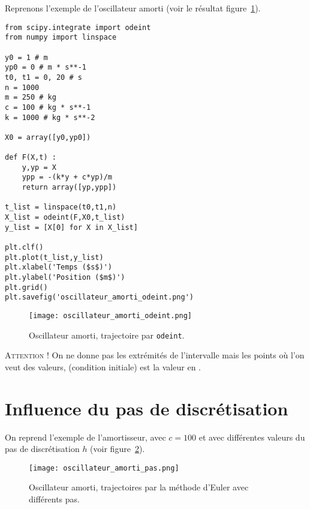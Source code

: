Reprenons l'exemple de l'oscillateur amorti (voir le résultat figure~\ref{11:fig:oscillateur_amorti_odeint}).
\begin{lstlisting}
from scipy.integrate import odeint
from numpy import linspace

y0 = 1 # m
yp0 = 0 # m * s**-1
t0, t1 = 0, 20 # s
n = 1000
m = 250 # kg
c = 100 # kg * s**-1
k = 1000 # kg * s**-2

X0 = array([y0,yp0])

def F(X,t) :
    y,yp = X
    ypp = -(k*y + c*yp)/m
    return array([yp,ypp])

t_list = linspace(t0,t1,n)
X_list = odeint(F,X0,t_list)
y_list = [X[0] for X in X_list]

plt.clf()
plt.plot(t_list,y_list)
plt.xlabel('Temps ($s$)')
plt.ylabel('Position ($m$)')
plt.grid()
plt.savefig('oscillateur_amorti_odeint.png')
\end{lstlisting}



\begin{figure}[!h]
    \begin{center}
        \texttt{[image: oscillateur\_amorti\_odeint.png]}
        \caption{Oscillateur amorti, trajectoire par \texttt{odeint}.}
        \label{11:fig:oscillateur_amorti_odeint}
    \end{center}
\end{figure}
\textsc{Attention !} On ne donne pas les extrémités de l'intervalle mais les points  où l'on veut des valeurs,  (condition initiale) est la valeur en
  .



\section{Influence du pas de discrétisation}
On reprend l'exemple de l'amortisseur, avec $c=100$ et avec
différentes valeurs du pas de discrétisation $h$ (voir figure~\ref{11:fig:oscillateur_amorti_pas}).

\begin{figure}[!h]
    \begin{center}
        \texttt{[image: oscillateur\_amorti\_pas.png]}
        \caption{Oscillateur amorti, trajectoires par la méthode d'Euler avec différents pas.}
        \label{11:fig:oscillateur_amorti_pas}
    \end{center}
\end{figure}

